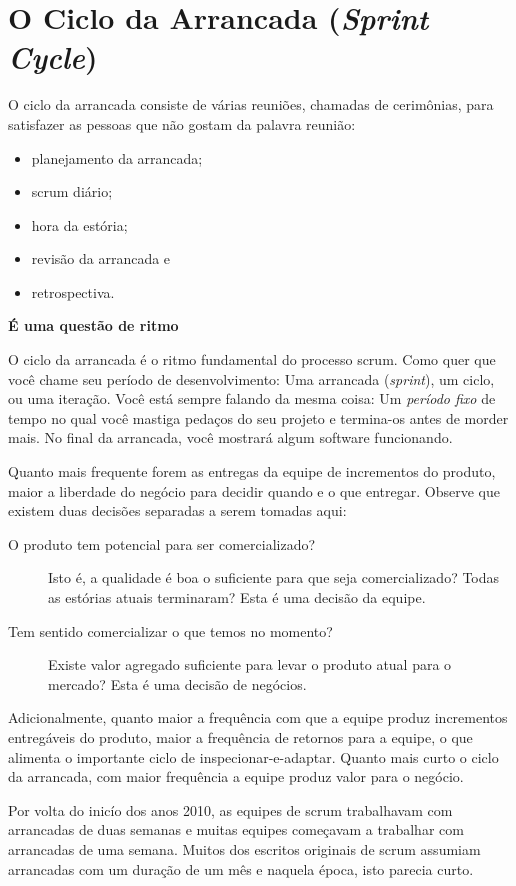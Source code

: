 \section{O Ciclo da Arrancada (\textit{Sprint Cycle})}

O ciclo da arrancada consiste de várias reuniões, chamadas de cerimônias, para satisfazer as pessoas que não gostam da palavra reunião:
\begin{itemize}
\item planejamento da arrancada;
\item scrum diário;
\item hora da estória;
\item revisão da arrancada e
\item retrospectiva.
\end{itemize}

\noindent \textbf{É uma questão de ritmo}

O ciclo da arrancada é o ritmo fundamental do processo scrum. Como quer que você chame seu período de desenvolvimento: Uma arrancada (\emph{sprint}), um ciclo, ou uma iteração. Você está sempre falando da mesma coisa: Um \emph{período fixo} de tempo no qual você mastiga pedaços do seu projeto e termina-os antes de morder mais. No final da arrancada, você mostrará algum software funcionando.

Quanto mais frequente forem as entregas da equipe de incrementos do produto, maior a liberdade do negócio para decidir quando e o que entregar. Observe que existem duas decisões separadas a serem tomadas aqui:

\begin{description}
\item[O produto tem potencial para ser comercializado?] Isto é, a qualidade é boa o suficiente para que seja comercializado? Todas as estórias atuais terminaram? Esta é uma decisão da equipe.
\item[Tem sentido comercializar o que temos no momento?] Existe valor agregado suficiente para levar o produto atual para o mercado? Esta é uma decisão de negócios.
\end{description}

Adicionalmente, quanto maior a frequência com que a equipe produz incrementos entregáveis do produto, maior a frequência de retornos para a equipe, o que alimenta o importante ciclo de inspecionar-e-adaptar. Quanto mais curto o ciclo da arrancada, com maior frequência a equipe produz valor para o negócio.

Por volta do inicío dos anos 2010, as equipes de scrum trabalhavam com arrancadas de duas semanas e muitas equipes começavam a trabalhar com arrancadas de uma semana. Muitos dos escritos originais de scrum assumiam arrancadas com um duração de um mês e naquela época, isto parecia curto.

